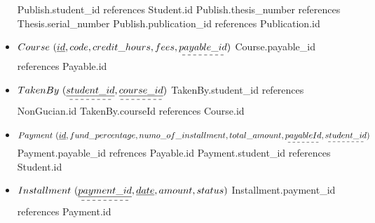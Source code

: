 \documentclass[a4paper]{article}
\begin{document}
\begin{itemize}
    \newline Publish.student\_id references Student.id 
    \newline Publish.thesis\_number references Thesis.serial\_number 
    \newline Publish.publication\_id references Publication.id
\newline
\item$ Course\ (\underline{id}, code, credit\_hours, fees, \dashuline{payable\_id})$
    \newline Course.payable\_id references Payable.id
\newline
\item$ TakenBy \ (\dashuline{\underline{student\_id}}, \dashuline{\underline{course\_id}})$
    \newline TakenBy.student\_id references NonGucian.id 
    \newline TakenBy.courseId references Course.id 
\newline
\item$ Payment \ (\underline{id}, fund\_percentage, numo\_of\_installment, total\_amount, \dashuline{payableId},\dashuline{student\_id })$
    \newline Payment.payable\_id refrences Payable.id 
    \newline Payment.student\_id references Student.id
\newline 
\item$ Installment\ (\dashuline{ \underline{payment\_id}}, \underline{date}, amount, status) $ 
    \newline Installment.payment\_id references Payment.id 
\end{itemize}
\end{document}
